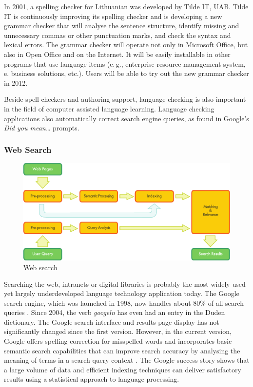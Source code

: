 \begin{multicols}{2}
In 2001, a spelling checker for Lithuanian was developed by Tilde IT, UAB. Tilde IT is continuously improving its spelling checker and is developing a new grammar checker that will analyse the sentence structure, identify missing and unnecessary commas or other punctuation marks, and check the syntax and lexical errors. The grammar checker will operate not only in Microsoft Office, but also in Open Office and on the Internet. It will be easily installable in other programs that use language items (e.\,g., enterprise resource management system, e. business solutions, etc.). Users will be able to try out the new grammar checker in 2012.

Beside spell checkers and authoring support, language checking is also important in the field of computer assisted language learning. Language checking applications also automatically correct search engine queries, as found in Google's \textit{Did you mean…} prompts.

\subsubsection{Web Search}

\begin{figure}[htb]
  \center
  \includegraphics[width=\textwidth]{../_media/english/web_search_architecture}
  \caption{Web search}
\label{fig:websearcharch_en}
 \end{figure}

Searching the web, intranets or digital libraries is probably the most widely used yet largely underdeveloped language technology application today. The Google search engine, which was launched in 1998, now handles about 80\% of all search queries \cite{spi1}. Since 2004, the verb \textit{googeln} has even had an entry in the Duden dictionary. The Google search interface and results page display has not significantly changed since the first version. However, in the current version, Google offers spelling correction for misspelled words and incorporates basic semantic search capabilities that can improve search accuracy by analysing the meaning of terms in a search query context \cite{pc1}. The Google success story shows that a large volume of data and efficient indexing techniques can deliver satisfactory results using a statistical approach to language processing. 


\end{multicols}
